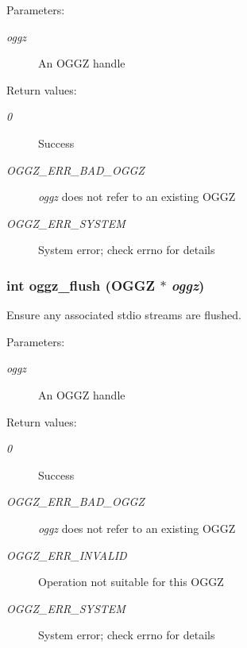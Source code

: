 \begin{Desc}
\item[Parameters:]
\begin{description}
\item[{\em oggz}]An OGGZ handle \end{description}
\end{Desc}
\begin{Desc}
\item[Return values:]
\begin{description}
\item[{\em 0}]Success \item[{\em OGGZ\_\-ERR\_\-BAD\_\-OGGZ}]{\em oggz\/} does not refer to an existing OGGZ \item[{\em OGGZ\_\-ERR\_\-SYSTEM}]System error; check errno for details \end{description}
\end{Desc}
\subsubsection{\setlength{\rightskip}{0pt plus 5cm}int oggz\_\-flush ({\bf OGGZ} $\ast$ {\em oggz})}\label{oggz_8h_a7}


Ensure any associated stdio streams are flushed. 

\begin{Desc}
\item[Parameters:]
\begin{description}
\item[{\em oggz}]An OGGZ handle \end{description}
\end{Desc}
\begin{Desc}
\item[Return values:]
\begin{description}
\item[{\em 0}]Success \item[{\em OGGZ\_\-ERR\_\-BAD\_\-OGGZ}]{\em oggz\/} does not refer to an existing OGGZ \item[{\em OGGZ\_\-ERR\_\-INVALID}]Operation not suitable for this OGGZ \item[{\em OGGZ\_\-ERR\_\-SYSTEM}]System error; check errno for details \end{description}
\end{Desc}
